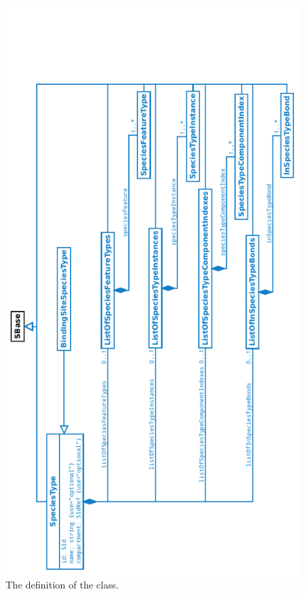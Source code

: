 \begin{figure}[htb]
  \begin{center}
    \includegraphics[angle=-90, scale=1]{./figs/multi_002_speciesType.pdf}
    \caption{The definition of the \SpeciesType class.}
  \label{fig:SpeciesType}
  \end{center}
\end{figure}

